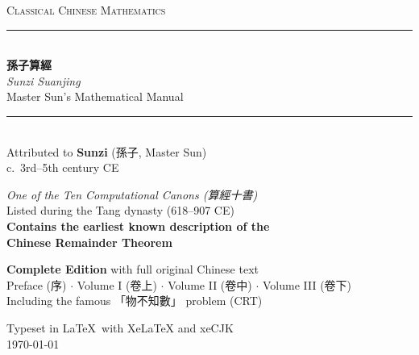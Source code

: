 \documentclass[11pt,a4paper]{article}
\newcommand{\longline}{\noindent\rule{\textwidth}{0.4pt}}
\newcommand{\zh}[1]{{\CJKfamily{}#1}}
\begin{document}
\begin{titlepage}
\begin{center}
\vspace*{1.5cm}

{\fontsize{14}{16}\selectfont\textsc{Classical Chinese Mathematics}}\\[0.6cm]

\longline\\[1cm]

{\fontsize{38}{44}\selectfont\bfseries\color{titlecolor}
\zh{孫子算經}}\\[0.6cm]

{\fontsize{22}{26}\selectfont\itshape Sunzi Suanjing}\\[0.4cm]

{\fontsize{15}{19}\selectfont Master Sun's Mathematical Manual}\\[1.2cm]

\longline\\[1.2cm]

{\large Attributed to \textbf{Sunzi} (\zh{孫子}, Master Sun)}\\[0.3cm]
{\normalsize c.\ 3rd--5th century CE}\\[1.5cm]

\begin{tcolorbox}[colback=chinesebg,colframe=rulecolor,boxrule=1pt,
  width=0.88\textwidth,arc=3mm]
\centering
\small
\textit{One of the Ten Computational Canons (\zh{算經十書})}\\[3pt]
Listed during the Tang dynasty (618--907 CE)\\[3pt]
\textbf{Contains the earliest known description of the\\Chinese Remainder Theorem}
\end{tcolorbox}

\vspace{1cm}

\begin{tcolorbox}[colback=chinesebg!60,colframe=rulecolor!70,boxrule=0.5pt,
  width=0.82\textwidth,arc=2mm]
\centering\small
\textbf{Complete Edition} with full original Chinese text\\[2pt]
Preface (\zh{序}) $\cdot$ Volume I (\zh{卷上}) $\cdot$ Volume II (\zh{卷中}) $\cdot$ Volume III (\zh{卷下})\\[2pt]
Including the famous \zh{「物不知數」} problem (CRT)
\end{tcolorbox}

\vfill

{\small Typeset in \LaTeX\ with XeLaTeX and xeCJK}\\[0.3cm]
{\small\today}

\end{center}
\end{titlepage}
\end{document}
